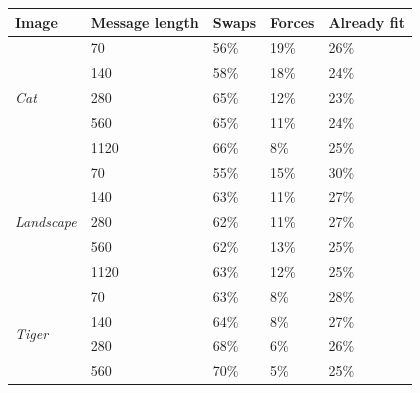 \vspace{12pt}
\begin{table}[]
\centering
\begin{tabular}{@{}lllll@{}}
\textbf{Image}                      & \textbf{Message length} & \textbf{Swaps} & \textbf{Forces} & \textbf{Already fit} \\ \midrule
\multirow{5}{*}{\textit{Cat}}       & 70                      & 56\%           & 19\%            & 26\%                 \\
                                    & 140                     & 58\%           & 18\%            & 24\%                 \\
                                    & 280                     & 65\%           & 12\%            & 23\%                 \\
                                    & 560                     & 65\%           & 11\%            & 24\%                 \\
                                    & 1120                    & 66\%           & 8\%             & 25\%                 \\ \midrule
\multirow{5}{*}{\textit{Landscape}} & 70                      & 55\%           & 15\%            & 30\%                 \\
                                    & 140                     & 63\%           & 11\%            & 27\%                 \\
                                    & 280                     & 62\%           & 11\%            & 27\%                 \\
                                    & 560                     & 62\%           & 13\%            & 25\%                 \\
                                    & 1120                    & 63\%           & 12\%            & 25\%                 \\ \midrule
\multirow{5}{*}{\textit{Tiger}}     & 70                      & 63\%           & 8\%             & 28\%                 \\
                                    & 140                     & 64\%           & 8\%             & 27\%                 \\
                                    & 280                     & 68\%           & 6\%             & 26\%                 \\
                                    & 560                     & 70\%           & 5\%             & 25\%                 \\

\end{tabular}
\end{table}
